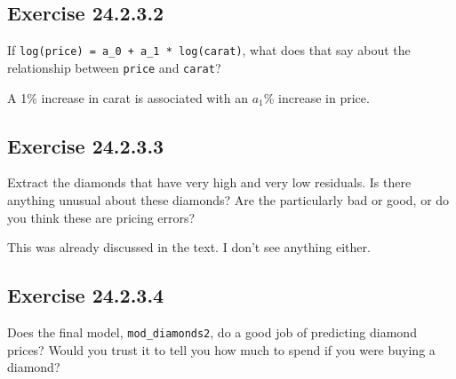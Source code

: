 \documentclass[]{book}
\newenvironment{Shaded}{\begin{snugshade}}{\end{snugshade}}
\newcommand{\CommentTok}[1]{\textcolor[rgb]{0.56,0.35,0.01}{\textit{#1}}}
\newcommand{\DataTypeTok}[1]{\textcolor[rgb]{0.13,0.29,0.53}{#1}}
\newcommand{\DecValTok}[1]{\textcolor[rgb]{0.00,0.00,0.81}{#1}}
\newcommand{\FloatTok}[1]{\textcolor[rgb]{0.00,0.00,0.81}{#1}}
\newcommand{\KeywordTok}[1]{\textcolor[rgb]{0.13,0.29,0.53}{\textbf{#1}}}
\newcommand{\NormalTok}[1]{#1}
\newcommand{\OperatorTok}[1]{\textcolor[rgb]{0.81,0.36,0.00}{\textbf{#1}}}
\newcommand{\StringTok}[1]{\textcolor[rgb]{0.31,0.60,0.02}{#1}}
\theoremstyle{plain}
\theoremstyle{remark}
\begin{document}
\hypertarget{exercise-24.2.3.2}{%
\subsection*{\texorpdfstring{Exercise
{24.2.3.2}}{Exercise 24.2.3.2}}\label{exercise-24.2.3.2}}

If \texttt{log(price)\ =\ a\_0\ +\ a\_1\ *\ log(carat)}, what does that
say about the relationship between \texttt{price} and \texttt{carat}?

A 1\% increase in carat is associated with an \(a_1\)\% increase in
price.

\hypertarget{exercise-24.2.3.3}{%
\subsection*{\texorpdfstring{Exercise
{24.2.3.3}}{Exercise 24.2.3.3}}\label{exercise-24.2.3.3}}

Extract the diamonds that have very high and very low residuals. Is
there anything unusual about these diamonds? Are the particularly bad or
good, or do you think these are pricing errors?

This was already discussed in the text. I don't see anything either.

\hypertarget{exercise-24.2.3.4}{%
\subsection*{\texorpdfstring{Exercise
{24.2.3.4}}{Exercise 24.2.3.4}}\label{exercise-24.2.3.4}}

Does the final model, \texttt{mod\_diamonds2}, do a good job of
predicting diamond prices? Would you trust it to tell you how much to
spend if you were buying a diamond?

\begin{Shaded}
\end{Shaded}
\end{document}

